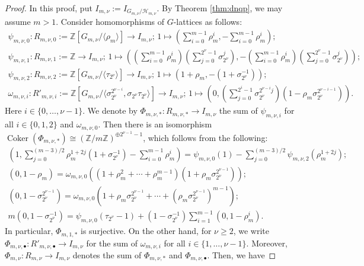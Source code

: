 \documentclass[12pt]{amsart}
\theoremstyle{plain}
\theoremstyle{definition}
\numberwithin{thm}{section}
\numberwithin{equation}{section}
\newcommand{\Z}{\mathbb{Z}}
\newcommand{\cH}{\mathcal{H}}
\DeclareMathOperator{\Coker}{Coker}
\begin{document}
\begin{proof}
In this proof, put $I_{m,\nu}:=I_{G_{m,\nu}/\cH_{m,\nu}}$. By Theorem \ref{thm:dnqp}, we may assume $m>1$. Consider homomorphisms of $G$-lattices as follows: 
\begin{gather*}
\psi_{m,\nu,0}\colon R_{m,\nu,0}:=\Z[G_{m,\nu}/\langle \rho_{m} \rangle]\rightarrow I_{m,\nu};\,1\mapsto \left(\sum_{i=0}^{m-1}\rho_{m}^{i},-\sum_{i=0}^{m-1}\rho_{m}^{i} \right);\\
\psi_{m,\nu,1}\colon R_{m,\nu,1}:=\Z \rightarrow I_{m,\nu};\,1\mapsto \left(\left(\sum_{i=0}^{m-1}\rho_{m}^{i}\right)\left(\sum_{j=0}^{2^{\nu}-1}\sigma_{2^{\nu}}^{j}\right),-\left(\sum_{i=0}^{m-1}\rho_{m}^{i}\right)\left(\sum_{j=0}^{2^{\nu}-1}\sigma_{2^{\nu}}^{j}\right) \right);\\
\psi_{m,\nu,2}\colon R_{m,\nu,2}:=\Z[G_{m,\nu}/\langle \tau_{2^{\nu}} \rangle]\rightarrow I_{m,\nu};\,1\mapsto (1+\rho_{m},-(1+\sigma_{2^{\nu}}^{-1}));\\
\omega_{m,\nu,i}\colon R'_{m,\nu,i}:=\Z[G_{m,\nu}/\langle \sigma_{2^{\nu}}^{2^{\nu-i}}, \sigma_{2^{\nu}} \tau_{2^{\nu}} \rangle]\rightarrow I_{m,\nu};\,1\mapsto \left(0,\left(\sum_{j=0}^{2^{i}-1}\sigma_{2^{\nu}}^{2^{\nu-i}j}\right)(1-\rho_{m}\sigma_{2^{\nu}}^{2^{\nu-i-1}}) \right). 
\end{gather*}
Here $i\in \{0,\ldots,\nu-1\}$. We denote by $\Phi_{m,\nu,\ast}\colon R_{m,\nu,\ast}\rightarrow I_{m,\nu}$ the sum of $\psi_{m,\nu,i}$ for all $i\in \{0,1,2\}$ and $\omega_{m,\nu,0}$. Then there is an isomorphism $\Coker(\Phi_{m,\nu,\ast})\cong (\Z/m\Z)^{\oplus 2^{\nu-1}-1}$, which follows from the following: 
\begin{gather*}
\left(1,\sum_{j=0}^{(m-3)/2}\rho_{m}^{1+2j}(1+\sigma_{2^{\nu}}^{-1})-\sum_{i=0}^{m-1}\rho_{m}^{i}\right)=\psi_{m,\nu,0}(1)-\sum_{j=0}^{(m-3)/2}\psi_{m,\nu,2}(\rho_{m}^{1+2j});\\
(0,1-\rho_{m})=\omega_{m,\nu,0}((1+\rho_{m}^{2}+\cdots+\rho_{m}^{m-1})(1+\rho_{m}\sigma_{2^{\nu}}^{2^{\nu-1}}));\\
(0,1-\sigma_{2^{\nu}}^{2^{\nu-1}})=\omega_{m,\nu,0}(1+\rho_{m}\sigma_{2^{\nu}}^{2^{\nu-1}}+\cdots +(\rho_{m}\sigma_{2^{\nu}}^{2^{\nu-1}})^{m-1});\\
m(0,1-\sigma_{2^{\nu}}^{-1})=\psi_{m,\nu,0}(\tau_{2^{\nu}}-1)+(1-\sigma_{2^{\nu}}^{-1})\sum_{i=1}^{m-1}(0,1-\rho_{m}^{i}). 
\end{gather*}
In particular, $\Phi_{m,1,\ast}$ is surjective. On the other hand, for $\nu \geq 2$, we write $\Phi_{m,\nu,\bullet}\colon R'_{m,\nu,\bullet}\rightarrow I_{m,\nu}$ for the sum of $\omega_{m,\nu,i}$ for all $i\in \{1,\ldots,\nu-1\}$. Moreover, $\Phi_{m,\nu} \colon R_{m,\nu}\rightarrow I_{m,\nu}$ denotes the sum of $\Phi_{m,\nu,\ast}$ and $\Phi_{m,\nu,\bullet}$. Then, we have

\end{proof}
\end{document}
